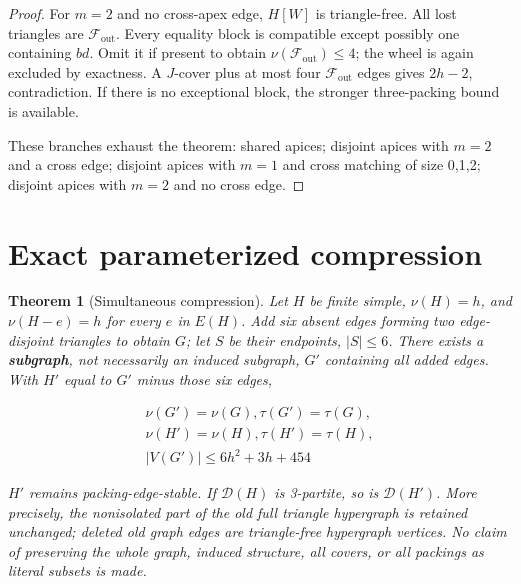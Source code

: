 \documentclass[11pt]{article}
\newtheorem{theorem}{Theorem}[section]
\theoremstyle{definition}\newtheorem{definition}[theorem]{Definition}
\theoremstyle{remark}\newtheorem{remark}[theorem]{Remark}
\begin{document}
\begin{proof}
For \(m=2\) and no cross-apex edge, \(H[W]\) is triangle-free. All lost triangles are \(\mathcal F_{\mathrm{out}}\). Every equality block is compatible except possibly one containing \(bd\). Omit it if present to obtain \(\nu(\mathcal F_{\mathrm{out}})\le 4\); the wheel is again excluded by exactness. A \(J\)-cover plus at most four \(\mathcal F_{\mathrm{out}}\) edges gives \(2h-2\), contradiction. If there is no exceptional block, the stronger three-packing bound is available.

These branches exhaust the theorem: shared apices; disjoint apices with \(m=2\) and a cross edge; disjoint apices with \(m=1\) and cross matching of size 0,1,2; disjoint apices with \(m=2\) and no cross edge.
\end{proof}

\section{Exact parameterized compression}\label{sec:compression}
\begin{theorem}[Simultaneous compression]\label{thm:compression}
Let \(H\) be finite simple, \(\nu(H)=h\), and \(\nu(H-e)=h\) for every \(e\) in \(E(H)\). Add six absent edges forming two edge-disjoint triangles to obtain \(G\); let \(S\) be their endpoints, \(|S|\le 6\). There exists a \textbf{subgraph}, not necessarily an induced subgraph, \(G'\) containing all added edges. With \(H'\) equal to \(G'\) minus those six edges,

\begin{equation}
\begin{gathered}
\nu(G')=\nu(G), \tau(G')=\tau(G), \\
\nu(H')=\nu(H), \tau(H')=\tau(H), \\
|V(G')| \le  6h^2+3h+454
\end{gathered}
\end{equation}

\(H'\) remains packing-edge-stable. If \(\mathcal D(H)\) is 3-partite, so is \(\mathcal D(H')\). More precisely, the nonisolated part of the old full triangle hypergraph is retained unchanged; deleted old graph edges are triangle-free hypergraph vertices. No claim of preserving the whole graph, induced structure, all covers, or all packings as literal subsets is made.
\end{theorem}
\end{document}
